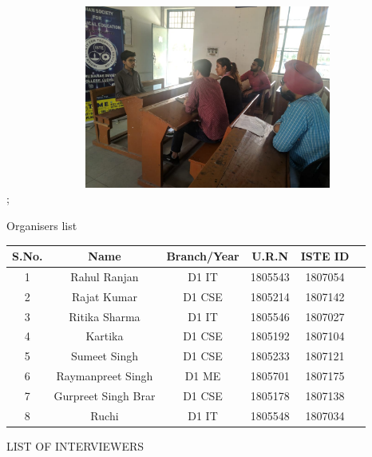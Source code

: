 \documentclass[12pt, a4 paper]{article}
\begin{document}
\vline

\includegraphics[width=14cm,height=6cm]{image7.jpg};
\newpage
\begin{center}
\huge Organisers list
\end{center}

\begin{table}[h!]
  \begin{center}
    \begin{tabular}{|c|c|c|c|c|c|} 
    \toprule %
      \textbf{S.No.} & \textbf{Name} & \textbf{Branch/Year} & \textbf{U.R.N} &\textbf{ISTE ID} \\
      \midrule %
      1 & Rahul Ranjan	      & D1 IT  & 1805543 & 1807054 \\
      2	& Rajat Kumar	      & D1 CSE & 1805214 & 1807142 \\
      3	& Ritika Sharma	      & D1 IT  & 1805546 & 1807027 \\
      4	& Kartika 	          & D1 CSE & 1805192 & 1807104 \\
      5	& Sumeet Singh	      & D1 CSE & 1805233 & 1807121 \\
      6	& Raymanpreet Singh   & D1 ME  & 1805701 & 1807175 \\
      7	& Gurpreet Singh Brar &	D1 CSE & 1805178 & 1807138 \\
      8	& Ruchi	              & D1 IT  & 1805548 & 1807034 \\

      \bottomrule %
    \end{tabular}
  \end{center}
\end{table}


\begin{center}
\huge LIST OF INTERVIEWERS
\end{center}
\end{document}
